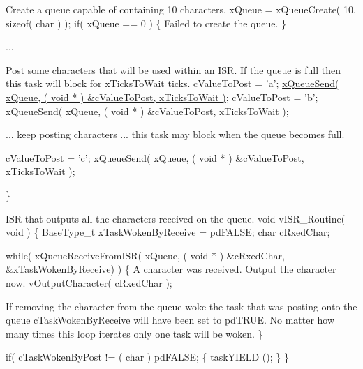\begin{DoxyPre}Create a queue capable of containing 10 characters.
    xQueue = xQueueCreate( 10, sizeof( char ) );
    if( xQueue == 0 )
    \{
Failed to create the queue.
    \}\end{DoxyPre}



\begin{DoxyPre}...\end{DoxyPre}



\begin{DoxyPre}Post some characters that will be used within an ISR.  If the queue
is full then this task will block for xTicksToWait ticks.
    cValueToPost = 'a';
    \hyperlink{queue_8h_af7eb49d3249351176992950d9185abe9}{xQueueSend( xQueue, ( void * ) &cValueToPost, xTicksToWait )};
    cValueToPost = 'b';
    \hyperlink{queue_8h_af7eb49d3249351176992950d9185abe9}{xQueueSend( xQueue, ( void * ) &cValueToPost, xTicksToWait )};\end{DoxyPre}



\begin{DoxyPre}... keep posting characters ... this task may block when the queue
becomes full.
\begin{DoxyVerb}cValueToPost = 'c';
xQueueSend( xQueue, ( void * ) &cValueToPost, xTicksToWait );
\end{DoxyVerb}

 \}\end{DoxyPre}



\begin{DoxyPre}ISR that outputs all the characters received on the queue.
 void vISR\_Routine( void )
 \{
 BaseType\_t xTaskWokenByReceive = pdFALSE;
 char cRxedChar;\end{DoxyPre}



\begin{DoxyPre}    while( xQueueReceiveFromISR( xQueue, ( void * ) &cRxedChar, &xTaskWokenByReceive) )
    \{
A character was received.  Output the character now.
        vOutputCharacter( cRxedChar );\end{DoxyPre}



\begin{DoxyPre}If removing the character from the queue woke the task that was
posting onto the queue cTaskWokenByReceive will have been set to
pdTRUE.  No matter how many times this loop iterates only one
task will be woken.
    \}\end{DoxyPre}



\begin{DoxyPre}    if( cTaskWokenByPost != ( char ) pdFALSE;
    \{
        taskYIELD ();
    \}
 \}
 \end{DoxyPre}
 